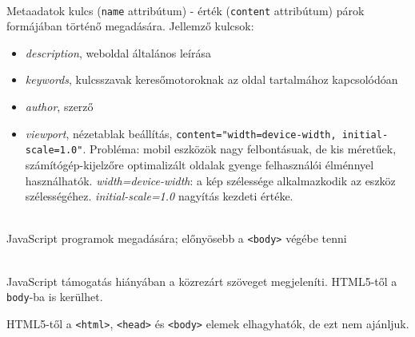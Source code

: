 \begin{frame}
  \begin{description}[m]
    \item[\texttt{<meta>}] \hfill \\ Metaadatok kulcs (\texttt{name} attribútum) - érték (\texttt{content} attribútum) párok formájában történő megadására. Jellemző kulcsok:
    \begin{itemize}
      \item \emph{description}, weboldal általános leírása
      \item \emph{keywords}, kulcsszavak keresőmotoroknak az oldal tartalmához kapcsolódóan
      \item \emph{author}, szerző
      \item \emph{viewport}, nézetablak beállítás, \texttt{content="width=device-width, initial-scale=1.0"}. Probléma: mobil eszközök nagy felbontásuak, de kis méretűek, számítógép-kijelzőre optimalizált oldalak gyenge felhasználói élménnyel használhatók. \emph{width=device-width}: a kép szélessége alkalmazkodik az eszköz szélességéhez. \emph{initial-scale=1.0} nagyítás kezdeti értéke. 
    \end{itemize}
  \end{description}
\end{frame}

\begin{frame}
  \begin{description}[m]
    \item[\texttt{<script>}] \hfill \\ JavaScript programok megadására; előnyösebb a \texttt{<body>} végébe tenni
    \item[\texttt{<noscript>}] \hfill \\ JavaScript támogatás hiányában a közrezárt szöveget megjeleníti. HTML5-től a \texttt{body}-ba is kerülhet.
  \end{description}
  \vfill
  HTML5-től a \texttt{<html>}, \texttt{<head>} és \texttt{<body>} elemek elhagyhatók, de ezt nem ajánljuk.
\end{frame}

